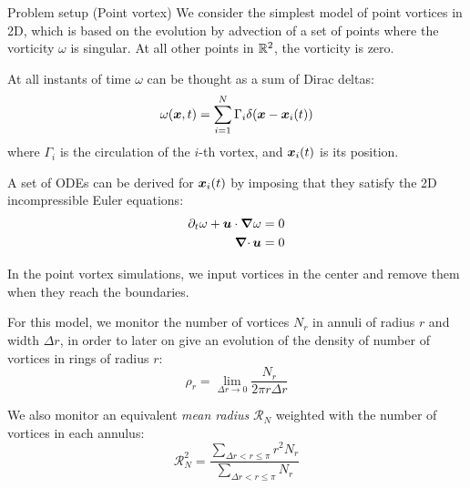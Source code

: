 \documentclass{beamer} %
\begin{document}
\begin{frame}{Problem setup (Point vortex)}
	We consider the simplest model of point vortices in 2D, which is based on the evolution by advection of a set of points where the vorticity $\omega$ is singular. At all other points in $\mathbb{R}^2$, the vorticity is zero.

	At all instants of time $\omega$ can be thought as a sum of Dirac deltas:
	\begin{equation*}
		\omega(\boldsymbol{x},t) = \sum_{i=1}^{N} \Gamma_i \delta(\boldsymbol{x} - \boldsymbol{x}_i(t))
	\end{equation*}
	where $\Gamma_i$ is the circulation of the $i$-th vortex, and $\boldsymbol{x}_i(t)$ is its position.

	A set of ODEs can be derived for $\boldsymbol{x}_i(t)$ by imposing that they satisfy the 2D incompressible Euler equations:
	\begin{align*}
		\partial_t{\omega} + \boldsymbol{u} \cdot \grad {\omega} & = 0 \\
		\operatorname{\boldsymbol{\nabla}\cdot} \boldsymbol{u}                                     & = 0
	\end{align*}
\end{frame}
\begin{frame}
	In the point vortex simulations, we input vortices in the center and remove them when they reach the boundaries.

	For this model, we monitor the number of vortices $N_r$ in annuli of radius $r$ and width $\Delta r$, in order to later on give an evolution of the density of number of vortices in rings of radius $r$:
	$$
		\rho_r = \lim_{\Delta r\to 0} \frac{N_r}{2\pi r \Delta r}
	$$

	We also monitor an equivalent \emph{mean radius} $\mathcal{R}_N$ weighted with the number of vortices in each annulus:
	$$
		\mathcal{R}_N^2 = \frac{\sum_{\Delta r<r\leq \pi} r^2 N_r}{\sum_{\Delta r<r\leq \pi} N_r}
	$$
\end{frame}
\end{document}
